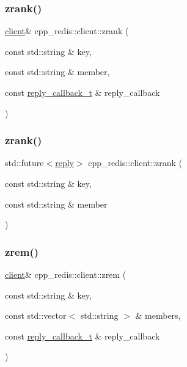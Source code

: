 \subsubsection{\texorpdfstring{zrank()}{zrank()}\hspace{0.1cm}{\footnotesize\ttfamily [1/2]}}
{\footnotesize\ttfamily \hyperlink{classcpp__redis_1_1client}{client}\& cpp\+\_\+redis\+::client\+::zrank (\begin{DoxyParamCaption}\item[{const std\+::string \&}]{key,  }\item[{const std\+::string \&}]{member,  }\item[{const \hyperlink{classcpp__redis_1_1client_a061a1140d36d2eaeda82b09a0bb3f9f2}{reply\+\_\+callback\+\_\+t} \&}]{reply\+\_\+callback }\end{DoxyParamCaption})}

\mbox{\label{classcpp__redis_1_1client_acf680674a3944a3baaa36f888250610e}} 
\subsubsection{\texorpdfstring{zrank()}{zrank()}\hspace{0.1cm}{\footnotesize\ttfamily [2/2]}}
{\footnotesize\ttfamily std\+::future$<$\hyperlink{classcpp__redis_1_1reply}{reply}$>$ cpp\+\_\+redis\+::client\+::zrank (\begin{DoxyParamCaption}\item[{const std\+::string \&}]{key,  }\item[{const std\+::string \&}]{member }\end{DoxyParamCaption})}

\mbox{\label{classcpp__redis_1_1client_ae33a0ea1127a5da870db4354fad2bd10}} 
\subsubsection{\texorpdfstring{zrem()}{zrem()}\hspace{0.1cm}{\footnotesize\ttfamily [1/2]}}
{\footnotesize\ttfamily \hyperlink{classcpp__redis_1_1client}{client}\& cpp\+\_\+redis\+::client\+::zrem (\begin{DoxyParamCaption}\item[{const std\+::string \&}]{key,  }\item[{const std\+::vector$<$ std\+::string $>$ \&}]{members,  }\item[{const \hyperlink{classcpp__redis_1_1client_a061a1140d36d2eaeda82b09a0bb3f9f2}{reply\+\_\+callback\+\_\+t} \&}]{reply\+\_\+callback }\end{DoxyParamCaption})}

